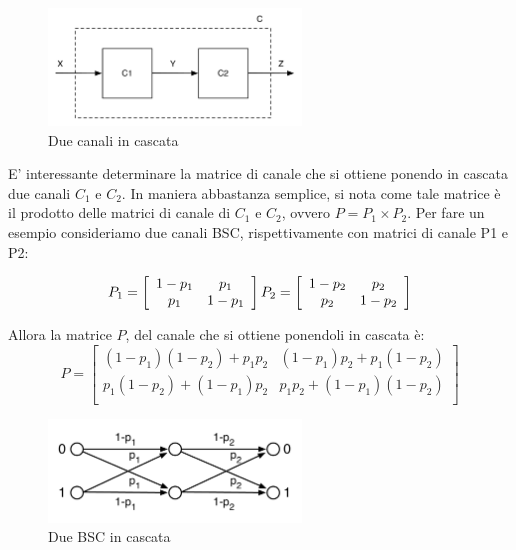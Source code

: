 \begin{figure}[htbp]
\begin{center}
	\includegraphics[width=0.6\textwidth]{img/cascata.pdf}
\caption{Due canali in cascata}
\label{fig:cascata}
\end{center}
\end{figure}

E' interessante determinare la matrice di canale che si ottiene ponendo in cascata due canali $C_1$ e $C_2$. In maniera abbastanza semplice, si nota come tale matrice è il prodotto delle matrici di canale di $C_1$ e $C_2$, ovvero $P=P_1 \times P_2$. Per fare un esempio consideriamo due canali BSC, rispettivamente con matrici di canale P1 e P2:

\[ P_1 = \left[
  \begin{array}{cc}
    1-p_1 & p_1 \\
    p_1 & 1-p_1 \\
  \end{array} \right]
  \\
  P_2 = \left[
  \begin{array}{cc}
    1-p_2 & p_2 \\
    p_2 & 1-p_2 \\
  \end{array} \right]
\]

Allora la matrice $P$, del canale che si ottiene ponendoli in cascata è:
\[
 P = \left[
  \begin{array}{cc}
    (1-p_1)(1-p_2) + p_1 p_2 & (1-p_1)p_2 + p_1(1-p_2) \\
    p_1 (1-p_2)+(1-p_1)p_2 & p_1 p_2 +(1-p_1)(1-p_2)\\
  \end{array} \right]
\]

\begin{figure}[htbp]
\begin{center}
	\includegraphics[width=0.6\textwidth]{img/cascata2.pdf}
\caption{Due BSC in cascata}
\label{fig:cascata2}
\end{center}
\end{figure}


